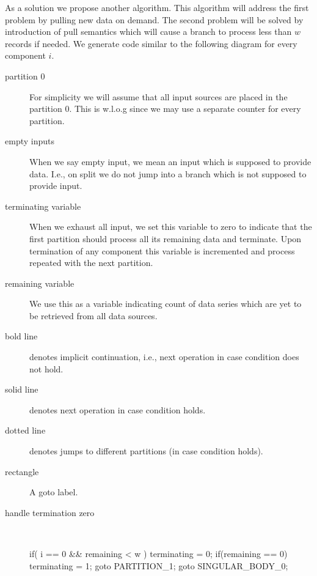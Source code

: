 As a solution we propose another algorithm. This algorithm will address the first problem by pulling new data on demand. The second problem will be solved by introduction of pull semantics which will cause a branch to process less than $w$ records if needed. We generate code similar to the following diagram for every component $i$.

\label{ordered_crawler}

\begin{description}
 \item[partition 0] For simplicity we will assume that all input sources are placed in the partition 0. This is w.l.o.g since we may use a separate counter for every partition. 
  \item[empty inputs] When we say empty input, we mean an input which is supposed to provide data. I.e., on split we do not jump into a branch which is not supposed to provide input.
  \item[terminating variable] When we exhaust all input, we set this variable to zero to indicate that the first partition should process all its remaining data and terminate. Upon termination of any component this variable is incremented and process repeated with the next partition.
  \item[remaining variable] We use this as a variable indicating count of data series which are yet to be retrieved from all data sources. 
  \item[bold line] denotes implicit continuation, i.e., next operation in case condition does not hold. 
  \item[solid line] denotes next operation in case condition holds.
  \item[dotted line] denotes jumps to different partitions (in case condition holds).
  \item[rectangle] A goto label.
  \item[handle termination zero] \ \ \ 
\begin{samepage}
\begin{code}
if( i == 0 && remaining < w )                            
{                                                          
  terminating = 0;                                     
  if(remaining == 0)                                   
  {                                                    
    terminating = 1;                                   
    goto PARTITION_1;                            
  }                                                    
  goto SINGULAR_BODY_0;
}                                                      

\end{code}
\end{samepage}
\end{description}
